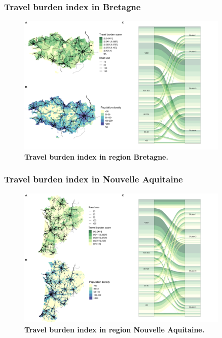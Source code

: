 \subsubsection{Travel burden index in Bretagne}

\begin{figure}[H]
    \includegraphics[width=0.9\textwidth]{images/routes/fig4_53.png}
    \centering
    \caption{
        \textbf{Travel burden index in region Bretagne.}
    }
    \label{fig:routes-burden-index-bretagne}
\end{figure}

\subsubsection{Travel burden index in Nouvelle Aquitaine}

\begin{figure}[H]
    \includegraphics[width=0.9\textwidth]{images/routes/fig4_75.png}
    \centering
    \caption{
        \textbf{Travel burden index in region Nouvelle Aquitaine.}
    }
    \label{fig:routes-burden-index-na}
\end{figure}

